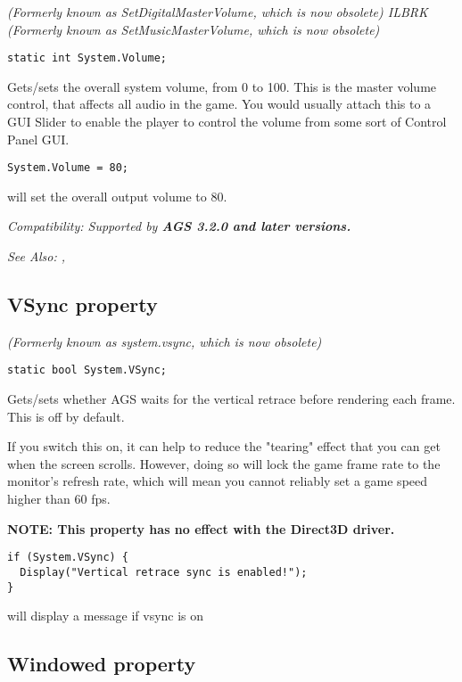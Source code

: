 \it{(Formerly known as SetDigitalMasterVolume, which is now obsolete)} ILBRK
\it{(Formerly known as SetMusicMasterVolume, which is now obsolete)}

\begin{verbatim}
static int System.Volume;
\end{verbatim}
Gets/sets the overall system volume, from 0 to 100. This is the master volume control, that
affects all audio in the game. You would usually attach this to a GUI Slider to enable the
player to control the volume from some sort of Control Panel GUI.

\begin{verbatim}
System.Volume = 80;
\end{verbatim}
will set the overall output volume to 80.

\it{Compatibility:} Supported by \bf{AGS 3.2.0} and later versions.

\it{See Also:} ,


\subsection{VSync property}\label{System.VSync}%

\it{(Formerly known as system.vsync, which is now obsolete)}

\begin{verbatim}
static bool System.VSync;
\end{verbatim}
Gets/sets whether AGS waits for the vertical retrace before rendering each frame.
This is off by default.

If you switch this on, it can help to reduce the "tearing" effect that you can
get when the screen scrolls. However, doing so will lock the game frame rate to
the monitor's refresh rate, which will mean you cannot reliably set a game speed higher
than 60 fps.

\bf{NOTE:} This property has no effect with the Direct3D driver.

\begin{verbatim}
if (System.VSync) {
  Display("Vertical retrace sync is enabled!");
}
\end{verbatim}
will display a message if vsync is on


\subsection{Windowed property}\label{System.Windowed}%

